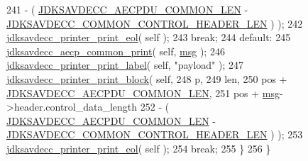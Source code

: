 \begin{DoxyCode}
241                                         - ( \hyperlink{group__aecpdu_ga1311febb873dfac7b4035ed25460f9d1}{JDKSAVDECC\_AECPDU\_COMMON\_LEN} - 
      \hyperlink{group__jdksavdecc__avtp__common__control__header_gaae84052886fb1bb42f3bc5f85b741dff}{JDKSAVDECC\_COMMON\_CONTROL\_HEADER\_LEN} ) );
242         \hyperlink{group__util_gacda56c9d3d24593a52c999682fa6e6e3}{jdksavdecc\_printer\_print\_eol}( \textcolor{keyword}{self} );
243         \textcolor{keywordflow}{break};
244     \textcolor{keywordflow}{default}:
245         \hyperlink{group__aecp__print_gabf23e817595afca199205bb410a5eca6}{jdksavdecc\_aecp\_common\_print}( \textcolor{keyword}{self}, \hyperlink{maap__log__linux_8c_a0c7e58a50354c4a4d6dad428d0e47029}{msg} );
246         \hyperlink{group__util_gaf7818b24143b3c7502926a425a242ff5}{jdksavdecc\_printer\_print\_label}( \textcolor{keyword}{self}, \textcolor{stringliteral}{"payload"} );
247         \hyperlink{group__util_ga18d7b11e396f21996dedde77febcb22f}{jdksavdecc\_printer\_print\_block}( \textcolor{keyword}{self},
248                                         p,
249                                         len,
250                                         pos + \hyperlink{group__aecpdu_ga1311febb873dfac7b4035ed25460f9d1}{JDKSAVDECC\_AECPDU\_COMMON\_LEN},
251                                         pos + \hyperlink{maap__log__linux_8c_a0c7e58a50354c4a4d6dad428d0e47029}{msg}->header.control\_data\_length
252                                         - ( \hyperlink{group__aecpdu_ga1311febb873dfac7b4035ed25460f9d1}{JDKSAVDECC\_AECPDU\_COMMON\_LEN} - 
      \hyperlink{group__jdksavdecc__avtp__common__control__header_gaae84052886fb1bb42f3bc5f85b741dff}{JDKSAVDECC\_COMMON\_CONTROL\_HEADER\_LEN} ) );
253         \hyperlink{group__util_gacda56c9d3d24593a52c999682fa6e6e3}{jdksavdecc\_printer\_print\_eol}( \textcolor{keyword}{self} );
254         \textcolor{keywordflow}{break};
255     \}
256 \}
\end{DoxyCode}


